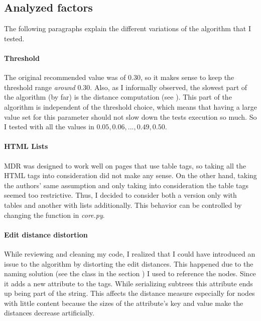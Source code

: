 \documentclass[10pt]{article}
\newcommand{\nodenamer}{\path{NodeNamer}}
\begin{document}
\subsection{Analyzed factors} \label{txt:analyzed-factors}

The following paragraphs explain the different variations of the algorithm that I tested.


\paragraph{Threshold}

The original recommended value was of $0.30$, so it makes sense to keep the threshold range \emph{around} $0.30$. Also, as I informally observed, the slowest part of the algorithm (by far) is the distance computation (see ). This part of the algorithm is independent of the threshold choice, which means that having a large value set for this parameter should not slow down the tests execution so much. So I tested with all the values in ${0.05, 0.06, ..., 0.49, 0.50}$.

\paragraph{HTML Lists} 

MDR was designed to work well on pages that use table tags, so taking all the HTML tags into consideration did not make any sense. On the other hand, taking the authors' same assumption and only taking into consideration the table tags seemed too restrictive. Thus, I decided to consider both a version only with tables and another with lists additionally. This behavior can be controlled by changing the function  in \emph{core.py}.

\paragraph{Edit distance distortion}

While reviewing and cleaning my code, I realized that I could have introduced an issue to the algorithm by distorting the edit distances. This happened due to the naming solution (see the class \nodenamer{} in the section ) I used to reference the nodes. Since it adds a new attribute to the tags. While serializing subtrees this attribute ends up being part of the string. This affects the distance measure especially for nodes with little content because the sizes of the attribute's key and value make the distances decrease artificially. 
\end{document}
